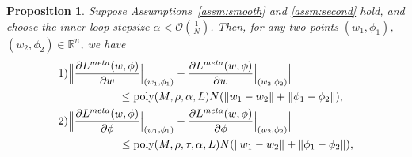 \documentclass{osudissert96}
\newtheorem{proposition}{Proposition}
\begin{document}
\begin{proposition}\label{le:smooth_nonconvex}%
Suppose Assumptions~\ref{assm:smooth} and \ref{assm:second} hold, and choose the inner-loop stepsize {\small$\alpha <\mathcal{O}(\frac{1}{N})$}.  
Then, for any two points $(w_1,\phi_1)$, $(w_2,\phi_2)\in\mathbb{R}^n$, we have 
\begin{align*}
1) \Big\| &\frac{\partial L^{meta}( w,\phi)}{\partial w} \Big |_{(w_1,\phi_1)} -  \frac{\partial L^{meta}( w,\phi)}{\partial w} \Big |_{(w_2,\phi_2)} \Big\|
\\&\quad\quad\quad\quad \leq\text{\normalfont poly}(M,\rho,\alpha,L) N(\|w_1-w_2\| + \|\phi_1-\phi_2\|),
\\ 2) \Big\| &\frac{\partial L^{meta}( w,\phi)}{\partial \phi} \Big |_{(w_1,\phi_1)} -  \frac{\partial L^{meta}( w,\phi)}{\partial \phi} \Big |_{(w_2,\phi_2)} \Big\|
\\&\quad\quad\quad\quad\leq \text{\normalfont poly}(M,\rho,\tau,\alpha,L) N(\|w_1-w_2\| + \|\phi_1-\phi_2\|),

\end{align*}
\end{proposition}
\end{document}
